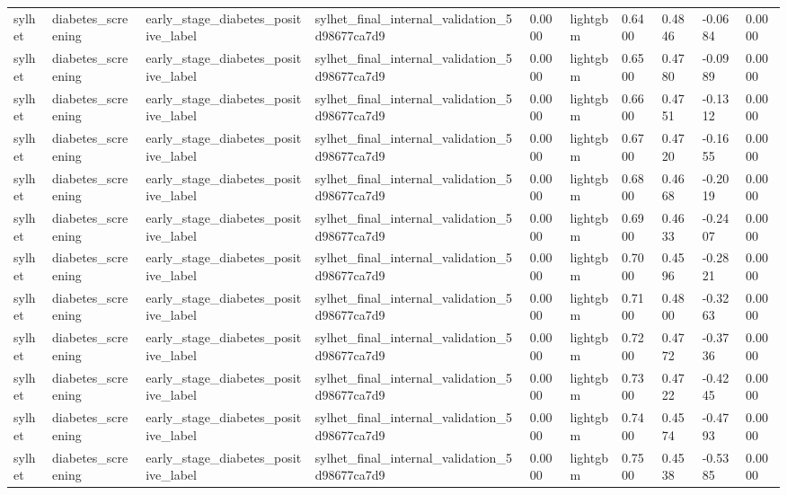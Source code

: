 \begin{tabular}{llllllllll}
sylhet & diabetes\_screening & early\_stage\_diabetes\_positive\_label & sylhet\_final\_internal\_validation\_5d98677ca7d9 & 0.0000 & lightgbm & 0.6400 & 0.4846 & -0.0684 & 0.0000 \\
sylhet & diabetes\_screening & early\_stage\_diabetes\_positive\_label & sylhet\_final\_internal\_validation\_5d98677ca7d9 & 0.0000 & lightgbm & 0.6500 & 0.4780 & -0.0989 & 0.0000 \\
sylhet & diabetes\_screening & early\_stage\_diabetes\_positive\_label & sylhet\_final\_internal\_validation\_5d98677ca7d9 & 0.0000 & lightgbm & 0.6600 & 0.4751 & -0.1312 & 0.0000 \\
sylhet & diabetes\_screening & early\_stage\_diabetes\_positive\_label & sylhet\_final\_internal\_validation\_5d98677ca7d9 & 0.0000 & lightgbm & 0.6700 & 0.4720 & -0.1655 & 0.0000 \\
sylhet & diabetes\_screening & early\_stage\_diabetes\_positive\_label & sylhet\_final\_internal\_validation\_5d98677ca7d9 & 0.0000 & lightgbm & 0.6800 & 0.4668 & -0.2019 & 0.0000 \\
sylhet & diabetes\_screening & early\_stage\_diabetes\_positive\_label & sylhet\_final\_internal\_validation\_5d98677ca7d9 & 0.0000 & lightgbm & 0.6900 & 0.4633 & -0.2407 & 0.0000 \\
sylhet & diabetes\_screening & early\_stage\_diabetes\_positive\_label & sylhet\_final\_internal\_validation\_5d98677ca7d9 & 0.0000 & lightgbm & 0.7000 & 0.4596 & -0.2821 & 0.0000 \\
sylhet & diabetes\_screening & early\_stage\_diabetes\_positive\_label & sylhet\_final\_internal\_validation\_5d98677ca7d9 & 0.0000 & lightgbm & 0.7100 & 0.4800 & -0.3263 & 0.0000 \\
sylhet & diabetes\_screening & early\_stage\_diabetes\_positive\_label & sylhet\_final\_internal\_validation\_5d98677ca7d9 & 0.0000 & lightgbm & 0.7200 & 0.4772 & -0.3736 & 0.0000 \\
sylhet & diabetes\_screening & early\_stage\_diabetes\_positive\_label & sylhet\_final\_internal\_validation\_5d98677ca7d9 & 0.0000 & lightgbm & 0.7300 & 0.4722 & -0.4245 & 0.0000 \\
sylhet & diabetes\_screening & early\_stage\_diabetes\_positive\_label & sylhet\_final\_internal\_validation\_5d98677ca7d9 & 0.0000 & lightgbm & 0.7400 & 0.4574 & -0.4793 & 0.0000 \\
sylhet & diabetes\_screening & early\_stage\_diabetes\_positive\_label & sylhet\_final\_internal\_validation\_5d98677ca7d9 & 0.0000 & lightgbm & 0.7500 & 0.4538 & -0.5385 & 0.0000 \\

\end{tabular}

